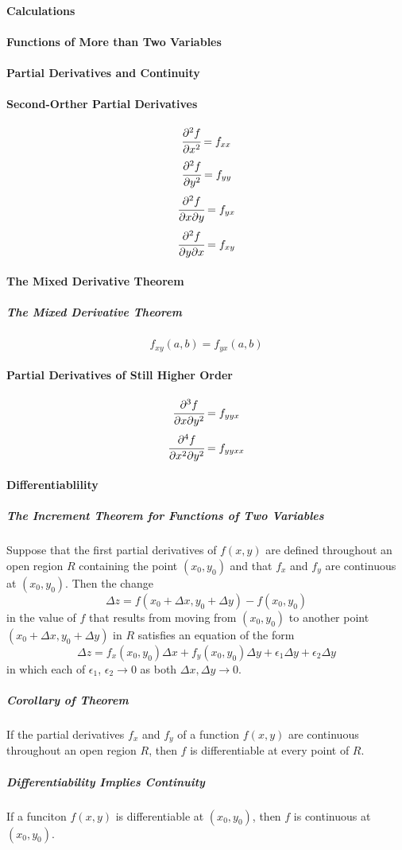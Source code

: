 \documentclass{article}
\begin{document}
            \paragraph{Calculations}
            \paragraph{Functions of More than Two Variables}
            \paragraph{Partial Derivatives and Continuity}
            \paragraph{Second-Orther Partial Derivatives}
                \[\cfrac{\partial^2f}{\partial x^2}=f_{xx}\]
                \[\cfrac{\partial^2f}{\partial y^2}=f_{yy}\]
                \[\cfrac{\partial^2f}{\partial x\partial y}=f_{yx}\]
                \[\cfrac{\partial^2f}{\partial y\partial x}=f_{xy}\]
            \paragraph{The Mixed Derivative Theorem}
                \subparagraph{The Mixed Derivative Theorem}
                \[f_{xy}(a,b)=f_{yx}(a,b)\]
            \paragraph{Partial Derivatives of Still Higher Order}
                \[\cfrac{\partial^3f}{\partial x\partial y^2}=f_{yyx}\]
                \[\cfrac{\partial^4f}{\partial x^2\partial y^2}=f_{yyxx}\]
            \paragraph{Differentiablility}
                \subparagraph{The Increment Theorem for Functions of Two Variables} Suppose that the first partial derivatives of $f(x,y)$ are defined throughout an open region $R$ containing the point $(x_0,y_0)$ and  that $f_x$ and $f_y$ are continuous at $(x_0,y_0)$. Then the change
                \[\Delta z=f(x_0+\Delta x,y_0+\Delta y)-f(x_0,y_0)\]
                in the value of $f$ that results from moving from $(x_0,y_0)$ to another point $(x_0+\Delta x,y_0+\Delta y)$ in $R$ satisfies an equation of the form
                \[\Delta z=f_x(x_0,y_0)\Delta x+f_y(x_0,y_0)\Delta y+\epsilon_1\Delta y+\epsilon_2 \Delta y\]
                in which each of $\epsilon_1$, $\epsilon_2\to 0$ as both $\Delta x,\Delta y\to 0$.
                \subparagraph{Corollary of Theorem} If the partial derivatives $f_x$ and $f_y$ of a function $f(x,y)$ are continuous throughout an open region $R$, then $f$ is differentiable at every point of $R$.
                \subparagraph{Differentiability Implies Continuity} If a funciton $f(x,y)$ is differentiable at $(x_0,y_0)$, then $f$ is continuous at $(x_0,y_0)$.
\end{document}
